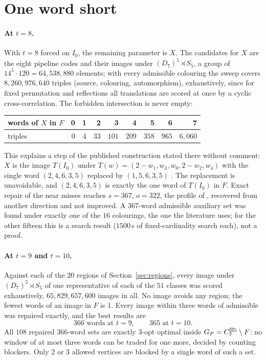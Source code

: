 \section{One word short}
\label{sec:gap}

\paragraph{At $t=8$.} With $t=8$ forced on $I_0$, the remaining parameter is $X$. The candidates for
$X$ are the eight pipeline codes and their images under $(D_7)^5\rtimes S_5$, a group of
$14^5\cdot 120=64{,}538{,}880$ elements; with every admissible colouring the sweep covers
$8{,}260{,}976{,}640$ triples (source, colouring, automorphism), exhaustively, since for fixed
permutation and reflections all translations are scored at once by a cyclic cross-correlation. The
forbidden intersection is never empty:

\begin{center}\small
\begin{tabular}{@{}lrrrrrrrr@{}}
\toprule
words of $X$ in $F$ & 0 & 1 & 2 & 3 & 4 & 5 & 6 & 7 \\
\midrule
triples & $0$ & $4$ & $33$ & $101$ & $209$ & $358$ & $965$ & $6{,}060$ \\
\bottomrule
\end{tabular}
\end{center}

This explains a step of the published construction stated there without comment: $X$ is the image
$T(I_0)$ under $T(w)=(2-w_1,w_3,w_0,2-w_2,w_4)$ with the single word $(2,4,6,3,5)$ replaced by
$(1,5,6,3,5)$ \cite{gao2026,tandon2026}. The replacement is unavoidable, and $(2,4,6,3,5)$ is exactly
the one word of $T(I_0)$ in $F$. Exact repair of the near misses reaches $s=367$, $o=322$, the profile
of \cite{bpz2026}, recovered from another direction and not improved. A $367$-word admissible
auxiliary set was found under exactly one of the $16$ colourings, the one the literature uses; for the
other fifteen this is a search result ($1500$\,s of fixed-cardinality search each), not a proof.

\paragraph{At $t=9$ and $t=10$.} Against each of the $20$ regions of Section~\ref{sec:regions}, every
image under $(D_7)^5\rtimes S_5$ of one representative of each of the $51$ classes was scored
exhaustively, $65{,}829{,}657{,}600$ images in all. No image avoids any region; the fewest words of an
image in $F$ is $1$. Every image within three words of admissible was repaired exactly, and the best
results are
\[
  366 \text{ words at } t=9,\qquad 365 \text{ at } t=10 .
\]
All $108$ repaired $366$-word sets are exactly $3$-opt optimal inside $G_F=C_7^{\boxtimes5}\setminus F$: no
window of at most three words can be traded for one more, decided by counting blockers. Only $2$ or
$3$ allowed vertices are blocked by a single word of such a set.

